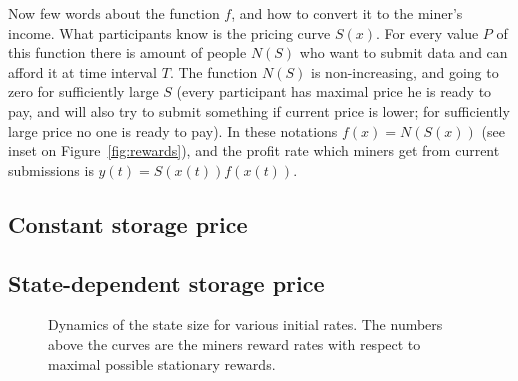 \documentclass[]{llncs}   %
\begin{document}
Now few words about the function $f$, and how to convert it to the miner's
income. What participants know is the pricing curve $S(x)$. For every value $P$
of this function there is amount of people $N(S)$ who want to submit data and
can afford it at time interval $T$. The function $N(S)$ is non-increasing, and
going to zero for sufficiently large $S$ (every participant has maximal price he
is ready to pay, and will also try to submit something if current price is
lower; for sufficiently large price no one is ready to pay). In these notations
$f(x)=N(S(x))$ (see inset on Figure~\ref{fig:rewards}), and the profit rate which
miners get from current submissions is $y(t) = S(x(t))f(x(t))$.

\subsection{Constant storage price}
\subsection{State-dependent storage price}
\begin{figure}
    
    \caption{
        \label{fig:dynamics} Dynamics of the state size for various initial
        rates. The numbers above the curves are the miners reward rates with
        respect to maximal possible stationary rewards.
    }
\end{figure}
\end{document}

